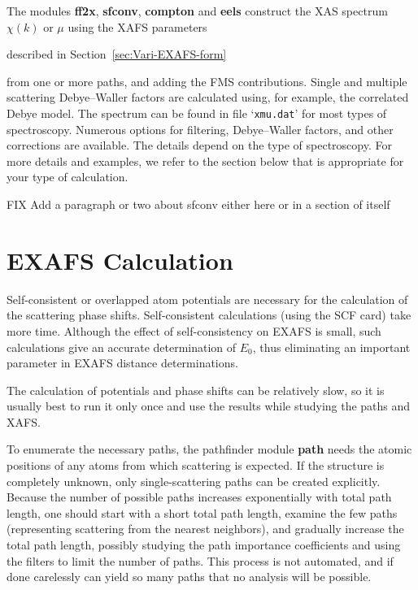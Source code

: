 \documentclass[11pt,oneside]{report} %
\newcommand{\file}[1]{`\texttt{#1}'}
\newcommand{\module}[1]{\textrm{\bf{#1}}}
\begin{document}
The modules \module{ff2x}, \module{sfconv}, \module{compton} and \module{eels} construct the XAS spectrum $\chi(k)$ or $\mu$ using the
XAFS parameters
\begin{latexonly}
  described in Section~\ref{sec:Vari-EXAFS-form} 
\end{latexonly}
from one or more paths, and adding the FMS contributions.
Single and multiple scattering Debye--Waller
factors are calculated using, for example, the correlated Debye model.
The spectrum can be found in file \file{xmu.dat} for most types of spectroscopy.  Numerous
options for filtering, Debye--Waller factors, and other corrections are
available.  The details depend on the type of spectroscopy.  For more details and examples, we refer to the section below that is appropriate for your type of calculation.

FIX Add a paragraph or two about sfconv either here or in a section of itself


\section{EXAFS Calculation}
\label{sec:EXAFS-calculation}
Self-consistent or overlapped atom potentials are necessary
for the calculation of the scattering phase shifts. Self-consistent
calculations (using the SCF card) take more time. 
Although the effect of self-consistency on EXAFS is small,
such calculations give an accurate determination of $E_0$,
thus eliminating an important parameter in EXAFS
distance determinations.

The calculation of potentials and phase shifts can be relatively slow, so it is usually best to run
it only once and use the results while studying the paths and XAFS.

To enumerate the necessary paths, the pathfinder module \module{path} needs the
atomic positions of any atoms from which scattering is expected. If
the structure is completely unknown, only single-scattering paths can be
created explicitly. Because the number of possible paths increases
exponentially with total path length, one should start with a short total path
length, examine the few paths (representing scattering from the nearest
neighbors), and gradually increase the total path length, possibly
studying the path importance coefficients and using the filters to
limit the number of paths. This process is not automated, and if done
carelessly can yield so many paths that no analysis will be possible.
\end{document}
